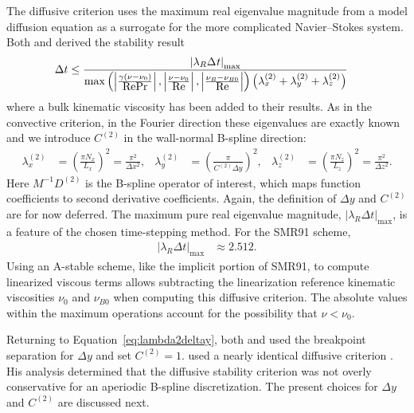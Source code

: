 The diffusive criterion uses the maximum real eigenvalue magnitude from a model
diffusion equation as a surrogate for the more complicated Navier--Stokes
system.
Both \citet[Equation~2.40]{Kwok2002} and
\citet[Equations~4.29--30]{Guarini1998} derived the stability
result
\begin{align}\label{eq:diffusivestability}
    \Delta{}t &\leq
    \frac{%
        \left|\lambda_{R}\Delta_{}t\right|_{\max}
    }{%
      \max\left(
        \left|\frac{\gamma\left(\nu-\nu_{0}\right)}{\mbox{Re}\mbox{Pr}}\right|,
        \left|\frac{\nu-\nu_{0}}{\mbox{Re}}\right|,
        \left|\frac{\nu_{B}-\nu_{B0}}{\mbox{Re}}\right|
      \right)
      \left(
          \lambda^{(2)}_x
        + \lambda^{(2)}_y
        + \lambda^{(2)}_z
      \right)
    }
\end{align}
where a bulk kinematic viscosity has been added to their results.  As in the
convective criterion, in the Fourier direction these eigenvalues are exactly
known and we introduce $C^{(2)}$ in the wall-normal B-spline direction:
\begin{align}\label{eq:lambda2deltay}
    \lambda^{(2)}_x &= \left(\frac{\pi N_x}{L_x}\right)^2
                     = \frac{\pi^2}{\Delta{}x^2},
    &
    \lambda^{(2)}_y &= \left(\frac{\pi}{C^{(2)} \Delta{}y}\right)^2,
    &
    \lambda^{(2)}_z &= \left(\frac{\pi N_z}{L_z}\right)^2
                     = \frac{\pi^2}{\Delta{}z^2}.
\end{align}
Here $M^{-1}D^{(2)}$ is the B-spline operator of interest, which maps function
coefficients to second derivative coefficients.  Again, the definition of
$\Delta{}y$ and $C^{(2)}$ are for now deferred.  The maximum pure real
eigenvalue magnitude, $\left|\lambda_{R}\Delta{}t\right|_{\max}$, is a feature
of the chosen time-stepping method.  For the SMR91 scheme,
\begin{align}
\left|\lambda_{R}\Delta{}t\right|_{\max} &\approx 2.512.
\end{align}
Using an A-stable scheme, like the implicit portion of SMR91, to compute
linearized viscous terms allows subtracting the linearization reference
kinematic viscosities $\nu_0$ and $\nu_{B0}$ when computing this diffusive
criterion.  The absolute values within the maximum operations account for the
possibility that $\nu<\nu_{0}$.

Returning to Equation~\eqref{eq:lambda2deltay}, both
\citeauthor{Guarini1998} and \citeauthor{Kwok2002} used the breakpoint
separation for $\Delta{}y$ and set $C^{(2)} = 1$.  \citeauthor{Venugopal2003}
used a nearly identical diffusive criterion
\citep[Equation~3.15]{Venugopal2003}.  His analysis determined that the
diffusive stability criterion was not overly conservative for an aperiodic
B-spline discretization.  The present choices for $\Delta{}y$ and $C^{(2)}$
are discussed next.

